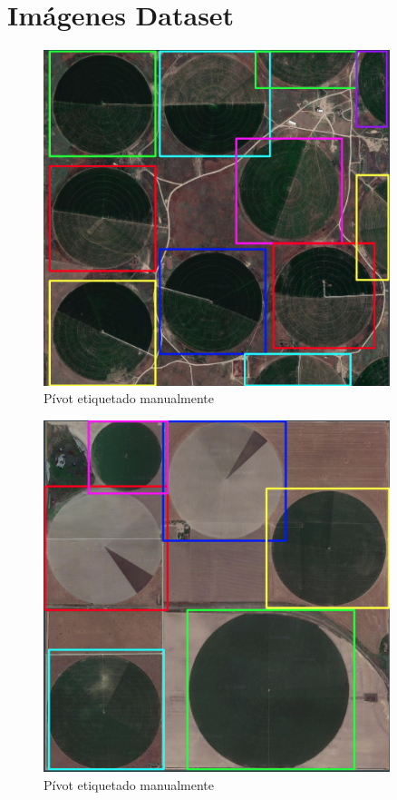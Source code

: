 \section{Imágenes Dataset} \label{anexo:dataset}

\begin{figure}
    \centering
    \includegraphics[width=0.9\textwidth]{img/pivot etiquetado manual - 1.png}
    \caption{Pívot etiquetado manualmente}
    \label{Pivot etiquetado manualmento 1}
\end{figure}

\begin{figure}
    \centering
    \includegraphics[width=0.9\textwidth]{img/pivot etiquetado manual - 2.png}
    \caption{Pívot etiquetado manualmente}
    \label{Pivot etiquetado manualmento 2}
\end{figure}

